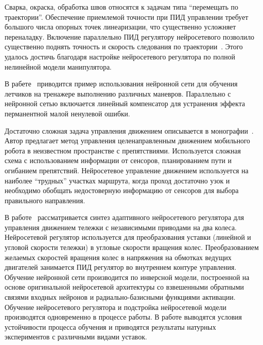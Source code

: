 Сварка, окраска, обработка швов относятся к задачам типа ``перемещать
по траектории''.  Обеспечение приемлемой точности при ПИД управлении
требует большого числа опорных точек линеаризации, что существенно
усложняет переналадку.  Включение параллельно ПИД регулятору
нейросетевого позволило существенно поднять точность и скорость
следования по траектории~\cite{chenmills97}.  Этого удалось достичь
благодаря настройке нейросетевого регулятора по полной нелинейной
модели манипулятора.



В рабете~\cite{steck96} приводится пример использования нейронной сети
для обучения летчиков на тренажере выполнению различных маневров.
Параллельно с нейронной сетью включается линейный компенсатор для
устранения эффекта перманентной малой ненулевой ошибки.


Достаточно сложная задача управления движением описывается в
монографии~\cite{golovko01}.  Автор предлагает метод управления
целенаправленным движением мобильного робота в неизвестном
пространстве с препятствиями.  Используется сложная схема с
использованием информации от сенсоров, планированием пути и огибанием
препятствий.  Нейросетевое управление движением используется на
наиболее ``трудных'' участках маршрута, когда проход достаточно узок и
необходимо обобщать недостоверную информацию от сенсоров для выбора
правильного направления.

В работе~\cite{boquete99} рассматривается синтез адаптивного
нейросетевого регулятора для управления движением тележки с
независимыми приводами на два колеса.  Нейросетевой регулятор
используется для преобразования уставки (линейной и угловой скорости
тележки) в угловые скорости вращения колес.  Преобразованием желаемых
скоростей вращения колес в напряжения на обмотках ведущих двигателей
занимается ПИД регулятор во внутреннем контуре управления.  Обучение
нейронной сети производится по инверсной модели, построенной на основе
оригинальной нейросетевой архитектуры со взвешенными обратными связями
входных нейронов и радиально-базисными функциями активации.  Обучение
нейросетевого регулятора и подстройка нейросетевой модели производятся
одновременно в процессе работы.  В работе выводятся условия
устойчивости процесса обучения и приводятся результаты натурных
экспериментов с различными видами уставок.

